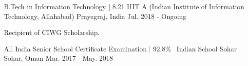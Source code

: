 

\begin{cventries}

  \cventry
    {B.Tech in Information Technology  |  8.21} %
    {IIIT A (Indian Institute of Information Technology, Allahabad)} %
    {Prayagraj, India} %
    {Jul. 2018 - Ongoing} %
    {
      \begin{cvitems} %
        \item {Recipient of CIWG Scholarship.}
      \end{cvitems}
    }
   
  \cventry
    {All India Senior School Certificate Examination   |  92.8\%\ }
    {Indian School Sohar}
    {Sohar, Oman}
    {Mar. 2017 - May. 2018}
    {}

\end{cventries}
